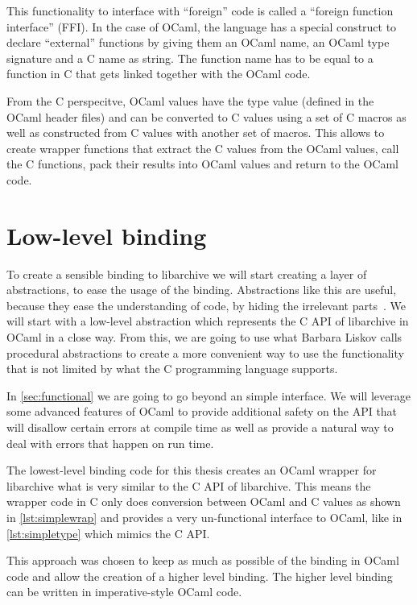 \documentclass[parskip=half]{scrreprt}
\newcommand\inline[1]{{\addfontfeature{Letters=SmallCaps}#1}}
\begin{document}
This functionality to interface with \enquote{foreign} code is called a
\enquote{foreign function interface} (FFI). In the case of OCaml, the language
has a special construct to declare \enquote{external} functions by giving them
an OCaml name, an OCaml type signature and a C name as string. The function
name has to be equal to a function in C that gets linked together with the
OCaml code.

From the C perspecitve, OCaml values have the type \inline{value} (defined in
the OCaml header files) and can be converted to C values using a set of C
macros as well as constructed from C values with another set of macros. This
allows to create wrapper functions that extract the C values from the OCaml
values, call the C functions, pack their results into OCaml values and return
to the OCaml code.

\section{Low-level binding}
\label{sec:lowlevel}

To create a sensible binding to libarchive we will start creating a layer of
abstractions, to ease the usage of the binding. Abstractions like this are
useful, because they ease the understanding of code, by hiding the irrelevant
parts~\cite{liskov1986abstraction}. We will start with a low-level abstraction
which represents the C API of libarchive in OCaml in a close way. From this, we
are going to use what Barbara Liskov calls procedural abstractions to create a
more convenient way to use the functionality that is not limited by what the C
programming language supports.

In \autoref{sec:functional} we are going to go beyond an simple interface. We
will leverage some advanced features of OCaml to provide additional safety on
the API that will disallow certain errors at compile time as well as provide a
natural way to deal with errors that happen on run time.

The lowest-level binding code for this thesis creates an OCaml wrapper for
libarchive what is very similar to the C API of libarchive. This means the
wrapper code in C only does conversion between OCaml and C values as shown in
\autoref{lst:simplewrap} and provides a very un-functional interface to OCaml,
like in \autoref{lst:simpletype} which mimics the C API.

This approach was chosen to keep as much as possible of the binding in OCaml
code and allow the creation of a higher level binding. The higher level binding
can be written in imperative-style OCaml code.
\end{document}

